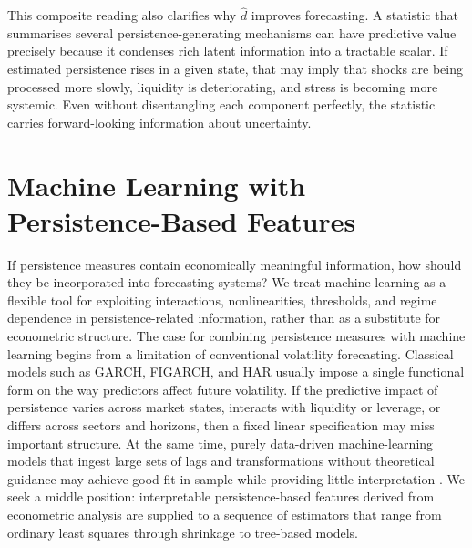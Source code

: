 \documentclass[11pt,a4paper]{article}
\newcommand{\dhat}{\hat d}
\begin{document}
This composite reading also clarifies why $\dhat$ improves forecasting.
A statistic that summarises several persistence-generating mechanisms can
have predictive value precisely because it condenses rich latent
information into a tractable scalar. If estimated persistence rises in a
given state, that may imply that shocks are being processed more slowly,
liquidity is deteriorating, and stress is becoming more systemic. Even
without disentangling each component perfectly, the statistic carries
forward-looking information about uncertainty.

\section{Machine Learning with Persistence-Based Features}
\label{sec:ml}

If persistence measures contain economically meaningful information, how
should they be incorporated into forecasting systems? We treat machine
learning as a flexible tool for exploiting interactions, nonlinearities,
thresholds, and regime dependence in persistence-related information,
rather than as a substitute for econometric structure. The case for
combining persistence measures with machine learning begins from a
limitation of conventional volatility forecasting. Classical models such
as GARCH, FIGARCH, and HAR usually impose a single functional form on
the way predictors affect future volatility. If the predictive impact of
persistence varies across market states, interacts with liquidity or
leverage, or differs across sectors and horizons, then a fixed linear
specification may miss important structure. At the same time, purely
data-driven machine-learning models that ingest large sets of lags and
transformations without theoretical guidance may achieve good fit in
sample while providing little interpretation
\citep{gu2020empirical,hastie2009elements}. We seek a middle position:
interpretable persistence-based features derived from econometric
analysis are supplied to a sequence of estimators that range from
ordinary least squares through shrinkage to tree-based models.
\end{document}
